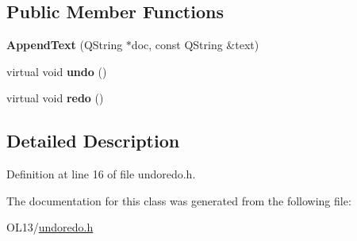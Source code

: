 \subsection*{Public Member Functions}
\begin{DoxyCompactItemize}
\item 
\mbox{\label{class_append_text_a1f053473808df00e83d26566b5be19cd}} 
{\bfseries Append\+Text} (Q\+String $\ast$doc, const Q\+String \&text)
\item 
\mbox{\label{class_append_text_a9289ddb9645f35cc98e05e77d96ca093}} 
virtual void {\bfseries undo} ()
\item 
\mbox{\label{class_append_text_a552142d5909b416eadbb4f6f728cb9d6}} 
virtual void {\bfseries redo} ()
\end{DoxyCompactItemize}


\subsection{Detailed Description}


Definition at line 16 of file undoredo.\+h.



The documentation for this class was generated from the following file\+:\begin{DoxyCompactItemize}
\item 
O\+L13/\hyperlink{undoredo_8h}{undoredo.\+h}\end{DoxyCompactItemize}
